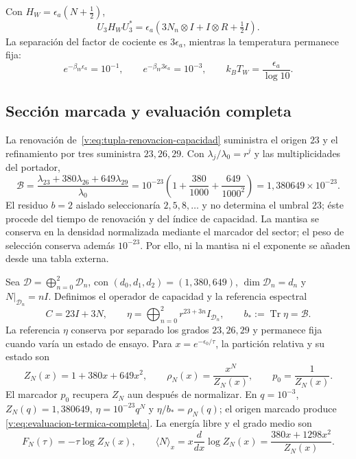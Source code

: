 Con $H_W=\epsilon_a(N+\tfrac12)$,
\begin{equation}
 U_3H_WU_3^*
 =\epsilon_a\left(3N_n\otimes I+I\otimes R+\tfrac12I\right).
 \label{v:eq:hamiltoniano-agrupado-decimal}
\end{equation}
La separación del factor de cociente es $3\epsilon_a$, mientras la
temperatura permanece fija:
\[
 e^{-\beta_W\epsilon_a}=10^{-1},\qquad
 e^{-\beta_W3\epsilon_a}=10^{-3},\qquad
 k_BT_W=\frac{\epsilon_a}{\log10}.
\]

\subsection{Sección marcada y evaluación completa}

La renovación de~\eqref{v:eq:tupla-renovacion-capacidad} suministra el
origen $23$ y el refinamiento por tres suministra $23,26,29$. Con
$\lambda_j/\lambda_0=r^j$ y las multiplicidades del portador,
\begin{equation}
 \boxed{
 \mathcal B
 =\frac{\lambda_{23}+380\lambda_{26}+649\lambda_{29}}{\lambda_0}
 =10^{-23}\left(1+\frac{380}{1000}+
                    \frac{649}{1000^2}\right)
 =1{,}380649\times10^{-23}.}
 \label{v:eq:evaluacion-termica-completa}
\end{equation}
El residuo $b=2$ aislado seleccionaría $2,5,8,\ldots$ y no determina el
umbral $23$; éste procede del tiempo de renovación y del índice de capacidad.
La mantisa se conserva en la densidad normalizada mediante el marcador del
sector; el peso de selección conserva además $10^{-23}$. Por ello, ni la
mantisa ni el exponente se añaden desde una tabla externa.

Sea
$\mathcal D=\bigoplus_{n=0}^2\mathcal D_n$, con
$(d_0,d_1,d_2)=(1,380,649)$,
$\dim\mathcal D_n=d_n$ y $N|_{\mathcal D_n}=nI$. Definimos el operador
de capacidad y la referencia espectral
\begin{equation}
 C=23I+3N,\qquad
 \eta=\bigoplus_{n=0}^2r^{23+3n}I_{\mathcal D_n},\qquad
 b_*:=\operatorname{Tr}\eta=\mathcal B.
 \label{v:eq:referencia-termica-eta}
\end{equation}
La referencia $\eta$ conserva por separado los grados $23,26,29$ y
permanece fija cuando varía un estado de ensayo. Para
$x=e^{-\epsilon_0/\tau}$, la partición relativa y su estado son
\begin{equation}
 Z_N(x)=1+380x+649x^2,\qquad
 \rho_N(x)=\frac{x^N}{Z_N(x)},\qquad
 p_0=\frac1{Z_N(x)}.
 \label{v:eq:particion-portador-termico}
\end{equation}
El marcador $p_0$ recupera $Z_N$ aun después de normalizar. En
$q=10^{-3}$, $Z_N(q)=1{,}380649$,
$\eta=10^{-23}q^N$ y $\eta/b_*=\rho_N(q)$; el origen marcado produce
\eqref{v:eq:evaluacion-termica-completa}. La energía libre y el grado medio son
\begin{equation}
 F_N(\tau)=-\tau\log Z_N(x),\qquad
 \langle N\rangle_x=x\frac{d}{dx}\log Z_N(x)
 =\frac{380x+1298x^2}{Z_N(x)}.
 \label{v:eq:energia-libre-grado-medio}
\end{equation}

